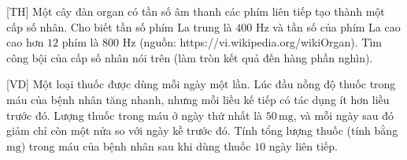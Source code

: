 \begin{bt}%
[TH] %
	Một cây đàn organ có tần số âm thanh các phím liên tiếp tạo thành một cấp số nhân. Cho biết tần số phím La trung là $400$ Hz và tần số của phím La cao cao hơn $12$ phím là $800$ Hz (nguồn: https://vi.wikipedia.org/wikiOrgan). Tìm công bội của cấp số nhân nói trên (làm tròn kết quả đến hàng phần nghìn).
\end{bt}

\begin{bt}%
[VD]%
	Một loại thuốc được dùng mỗi ngày một lần. Lúc đầu nồng độ thuốc trong máu của bệnh nhân tăng nhanh, nhưng mỗi liều kế tiếp có tác dụng ít hơn liều trước đó. Lượng thuốc trong máu ở ngày thứ nhất là $50 \,\mathrm{mg}$, và mỗi ngày sau đó giảm chỉ còn một nửa so với ngày kề trước đó. Tính tổng lượng thuốc (tính bằng $\mathrm{mg}$) trong máu của bệnh nhân sau khi dùng thuốc $10$ ngày liên tiếp.
\end{bt}

